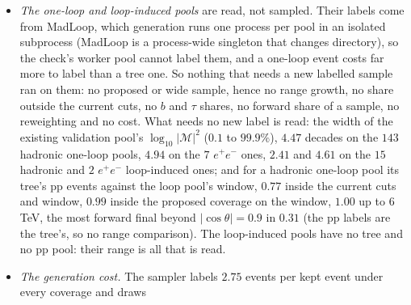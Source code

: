 \documentclass[11pt]{article}
\begin{document}
\begin{itemize}
    the base's events lie below the entry's threshold. Of the events inside, $0.98$ lie inside the current sample's
    $\log_{10}|\mathcal M|^2$ range and $0.97$ inside the proposed one's. The 31M pool events of these entries take
    $7.0$, $6.8$ and $6.6$ CPU-hours under the current, the proposed and the wide coverage.
  \item \emph{The one-loop and loop-induced pools} are read, not sampled. Their labels come from MadLoop, which
    generation runs one process per pool in an isolated subprocess (MadLoop is a process-wide singleton that changes
    directory), so the check's worker pool cannot label them, and a one-loop event costs far more to label than a tree
    one. So nothing that needs a new labelled sample ran on them: no proposed or wide sample, hence no range growth, no
    share outside the current cuts, no $b$ and $\tau$ shares, no forward share of a sample, no reweighting and no cost.
    What needs no new label is read: the width of the existing validation pool's $\log_{10}|\mathcal M|^2$ ($0.1$ to
    $99.9\%$), $4.47$ decades on the $143$ hadronic one-loop pools, $4.94$ on the $7$ $e^+e^-$ ones, $2.41$ and $4.61$ on
    the $15$ hadronic and $2$ $e^+e^-$ loop-induced ones; and for a hadronic one-loop pool its tree's pp events against
    the loop pool's window, $0.77$ inside the current cuts and window, $0.99$ inside the proposed coverage on the window,
    $1.00$ up to $6$\,TeV, the most forward final beyond $|\cos\theta|=0.9$ in $0.31$ (the pp labels are the tree's, so
    no range comparison). The loop-induced pools have no tree and no pp pool: their range is all that is read.
  \item \emph{The generation cost.} The sampler labels $2.75$ events per kept event under every coverage and draws

\end{itemize}
\end{document}
